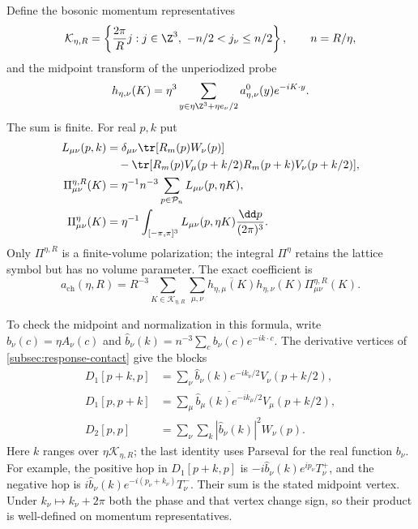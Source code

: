 \documentclass[11pt,letterpaper,reqno]{amsart}
\begin{document}
Define the bosonic momentum representatives
\[
 \mathcal K_{\eta,R}=
 \left\{\frac{2\pi}{R}j:j\in\Z^3,\ -n/2<j_\nu\le n/2\right\},
                   \qquad n=R/\eta,
\]
and the midpoint transform of the unperiodized probe
\begin{equation}\label{eq:response-midpoint-transform}
 h_{\eta,\nu}(K)=\eta^3
       \sum_{y\in\eta\Z^3+\eta e_\nu/2}
                     a_{\eta,\nu}^0(y)e^{-iK\cdot y}.
\end{equation}
The sum is finite. For real $p,k$ put
\begin{align}
 L_{\mu\nu}(p,k)
  &=\delta_{\mu\nu}\tr[R_m(p)W_\nu(p)]\notag\\
  &\quad-\tr[R_m(p)V_\mu(p+k/2)
                     R_m(p+k)V_\nu(p+k/2)],\label{eq:response-polarization-integrand}\\
 \Pi^{\eta,R}_{\mu\nu}(K)
  &=\eta^{-1}n^{-3}\sum_{p\in\mathcal P_n}
                       L_{\mu\nu}(p,\eta K),\notag\\
 \Pi^\eta_{\mu\nu}(K)
  &=\eta^{-1}\int_{[-\pi,\pi]^3}
          L_{\mu\nu}(p,\eta K)\frac{\dd p}{(2\pi)^3}.
                                  \label{eq:response-polarization-kernels}
\end{align}
Only $\Pi^{\eta,R}$ is a finite-volume polarization; the integral
$\Pi^\eta$ retains the lattice symbol but has no volume parameter.
The exact coefficient is
\begin{equation}\label{eq:response-polarization-identity}
 a_{\mathrm{ch}}(\eta,R)
    =R^{-3}\sum_{K\in\mathcal K_{\eta,R}}\sum_{\mu,\nu}
       \overline{h_{\eta,\mu}(K)}h_{\eta,\nu}(K)
                                      \Pi^{\eta,R}_{\mu\nu}(K).
\end{equation}

To check the midpoint and normalization in this formula, write
$b_\nu(c)=\eta A_\nu(c)$ and
$\widehat b_\nu(k)=n^{-3}\sum_cb_\nu(c)e^{-ik\cdot c}$.
The derivative vertices of \cref{subsec:response-contact}
give the blocks
\begin{align*}
 D_1[p+k,p]&=\sum_\nu\widehat b_\nu(k)e^{-ik_\nu/2}
                                          V_\nu(p+k/2),\\
 D_1[p,p+k]&=\sum_\mu
         \overline{\widehat b_\mu(k)e^{-ik_\mu/2}}
                                          V_\mu(p+k/2),\\
 D_2[p,p]&=\sum_\nu\sum_k|\widehat b_\nu(k)|^2W_\nu(p).
\end{align*}
Here $k$ ranges over $\eta\mathcal K_{\eta,R}$; the last
identity uses Parseval for the real function $b_\nu$.
For example, the positive hop in $D_1[p+k,p]$ is
$-i\widehat b_\nu(k)e^{ip_\nu}T_\nu^+$, and the negative hop
is $i\widehat b_\nu(k)e^{-i(p_\nu+k_\nu)}T_\nu^-$.
Their sum is the stated midpoint vertex. Under $k_\nu\mapsto
k_\nu+2\pi$ both the phase and that vertex change sign, so
their product is well-defined on momentum representatives.
\end{document}
